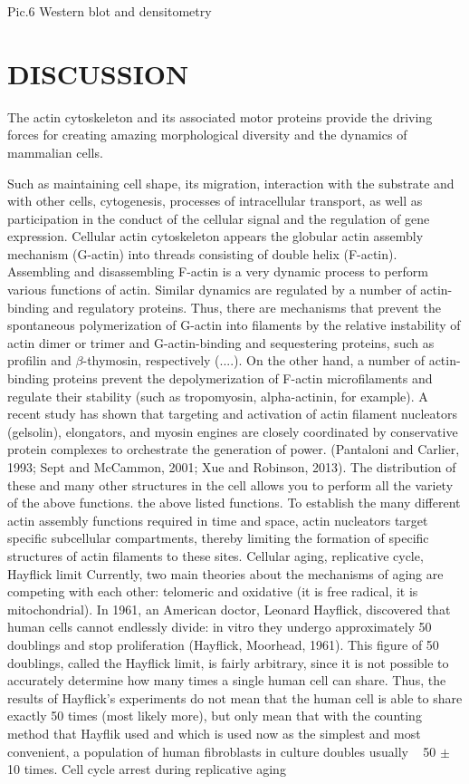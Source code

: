 \documentclass[english,authoryear]{elsarticle}
\begin{document}
Pic.6 Western blot and densitometry



\section{DISCUSSION}

The actin cytoskeleton and its associated motor proteins provide the driving forces for creating amazing morphological diversity and the dynamics of mammalian cells.

Such as maintaining cell shape, its migration, interaction with the substrate and with other cells, cytogenesis, processes of intracellular transport, as well as participation in the conduct of the cellular signal and the regulation of gene expression.
Cellular actin cytoskeleton appears
the globular actin assembly mechanism (G-actin) into threads consisting of double helix (F-actin).
Assembling and disassembling F-actin is a very dynamic process to perform various functions of actin. Similar dynamics are regulated by a number of actin-binding and regulatory proteins.
Thus, there are mechanisms that prevent the spontaneous polymerization of G-actin into filaments by the relative instability of actin dimer or trimer and G-actin-binding and sequestering proteins, such as profilin and $\beta$-thymosin, respectively (....).
On the other hand, a number of actin-binding proteins prevent the depolymerization of F-actin microfilaments and regulate their stability (such as tropomyosin, alpha-actinin, for example). A recent study has shown that targeting and activation of actin filament nucleators (gelsolin), elongators, and myosin engines are closely coordinated by conservative protein complexes to orchestrate the generation of power. (Pantaloni and Carlier, 1993; Sept and McCammon, 2001; Xue and Robinson, 2013). The distribution of these and many other structures in the cell allows you to perform all the variety of the above functions.
the above listed functions.
To establish the many different actin assembly functions required in time and space, actin nucleators target specific subcellular compartments, thereby limiting the formation of specific structures of actin filaments to these sites.
Cellular aging, replicative cycle, Hayflick limit
Currently, two main theories about the mechanisms of aging are competing with each other: telomeric and oxidative (it is free radical, it is mitochondrial). In 1961, an American doctor, Leonard Hayflick, discovered that human cells cannot endlessly divide: in vitro they undergo approximately 50 doublings and stop proliferation (Hayflick, Moorhead, 1961). This figure of 50 doublings, called the Hayflick limit, is fairly arbitrary, since it is not possible to accurately determine how many times a single human cell can share. Thus, the results of Hayflick's experiments do not mean that the human cell is able to share exactly 50 times (most likely more), but only mean that with the counting method that Hayflik used and which is used now as the simplest and most convenient, a population of human fibroblasts in culture doubles usually ~ 50 $\pm$ 10 times.
Cell cycle arrest during replicative aging
\end{document}
